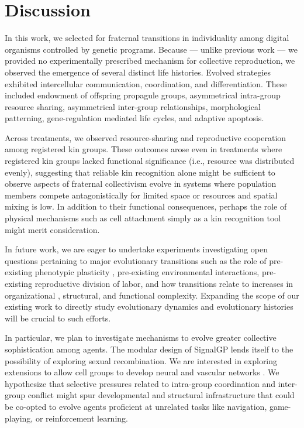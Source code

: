 \section{Discussion}


In this work, we selected for fraternal transitions in individuality among digital organisms controlled by genetic programs.
Because --- unlike previous work \citep{goldsby2012task, goldsby2014evolutionary} --- we provided no experimentally prescribed mechanism for collective reproduction, we observed the emergence of several distinct life histories.
Evolved strategies exhibited intercellular communication, coordination, and differentiation.
These included endowment of offspring propagule groups, asymmetrical intra-group resource sharing, asymmetrical inter-group relationships, morphological patterning, gene-regulation mediated life cycles, and adaptive apoptosis.

Across treatments, we observed resource-sharing and reproductive cooperation among registered kin groups.
These outcomes arose even in treatments where registered kin groups lacked functional significance (i.e., resource was distributed evenly), suggesting that reliable kin recognition alone might be sufficient to observe aspects of fraternal collectivism evolve in systems where population members compete antagonistically for limited space or resources and spatial mixing is low.
In addition to their functional consequences, perhaps the role of physical mechanisms such as cell attachment simply as a kin recognition tool might merit consideration.

In future work, we are eager to undertake experiments investigating open questions pertaining to major evolutionary transitions such as the role of pre-existing phenotypic plasticity \citep{clune2007investigating, lalejini2016evolutionary}, pre-existing environmental interactions, pre-existing reproductive division of labor, and how transitions relate to increases in organizational \citep{goldsby2012task}, structural, and functional \citep{goldsby2014evolutionary} complexity.
Expanding the scope of our existing work to directly study evolutionary dynamics and evolutionary histories will be crucial to such efforts.

In particular, we plan to investigate mechanisms to evolve greater collective sophistication among agents.
The modular design of SignalGP lends itself to the possibility of exploring sexual recombination.
We are interested in exploring extensions to allow cell groups to develop neural and vascular networks \citep{Moreno_Ofria_2020}.
We hypothesize that selective pressures related to intra-group coordination and inter-group conflict might spur developmental and structural infrastructure that could be co-opted to evolve agents proficient at unrelated tasks like navigation, game-playing, or reinforcement learning.

